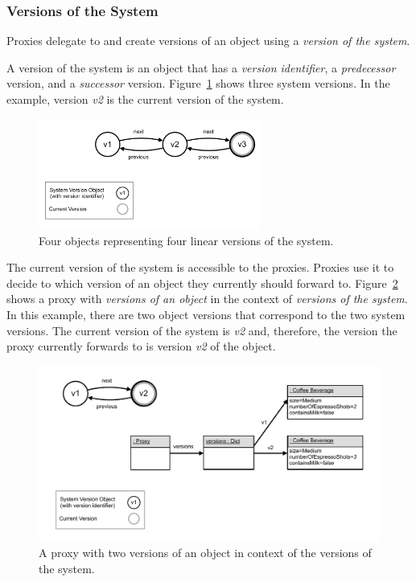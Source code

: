 \subsubsection{Versions of the System}

Proxies delegate to and create versions of an object using a \emph{version of the system}.

A version of the system is an object that has a \emph{version identifier}, a \emph{predecessor} version, and a \emph{successor} version.
Figure~\ref{fig:SystemVersions} shows three system versions.
In the example, version \emph{v2} is the current version of the system.

\begin{figure}[h]
    \centering
    \includegraphics[width=0.65\textwidth]{figures/4_approach/8_systemVersions.pdf}
    \caption{Four objects representing four linear versions of the system.}
    \label{fig:SystemVersions}
\end{figure}

The current version of the system is accessible to the proxies.
Proxies use it to decide to which version of an object they currently should forward to.
Figure~\ref{fig:ProxyUseSystemVersion} shows a proxy with \emph{versions of an object} in the context of \emph{versions of the system}.
In this example, there are two object versions that correspond to the two system versions.
The current version of the system is \emph{v2} and, therefore, the version the proxy currently forwards to is version \emph{v2} of the object.

\begin{figure}[h]
    \centering
    \includegraphics[width=\textwidth]{figures/4_approach/9_proxyUsesSystemVersion.pdf}
    \caption{A proxy with two versions of an object in context of the versions of the system.}
    \label{fig:ProxyUseSystemVersion}
\end{figure}

